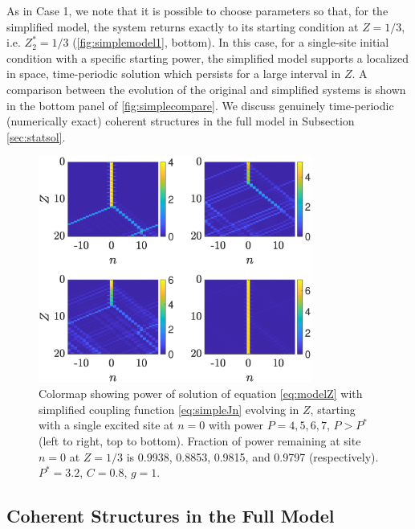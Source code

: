 \documentclass[reprint, amsmath,amssymb,aps,pre]{revtex4-2}
\begin{document}
As in Case 1, we note that it is possible to choose parameters so that, for the simplified model, the system returns exactly to its starting condition at $Z=1/3$, i.e. $Z_2^* = 1/3$ (\cref{fig:simplemodel1}, bottom). In this case, for a single-site initial condition with a specific starting power, the simplified model supports a localized in space, time-periodic solution which persists for a large interval in $Z$. A comparison between the evolution of the original and simplified systems is shown in the bottom panel of \cref{fig:simplecompare}. We discuss genuinely time-periodic (numerically exact) coherent structures in the full model in Subsection \cref{sec:statsol}. 
 
\begin{figure}
    \centering
    \includegraphics[width=9cm]{timestepsimpleabovepstar.eps}
    \caption{Colormap showing power of solution of equation \cref{eq:modelZ} with simplified coupling function \cref{eq:simpleJn} evolving in $Z$, starting with a single excited site at $n=0$ with power $P=4,5,6,7$, $P>P^*$ (left to right, top to bottom). Fraction of power remaining at site $n=0$ at $Z=1/3$ is 0.9938, 0.8853, 0.9815, and 0.9797 (respectively).
    $P^*=3.2$, $C=0.8$, $g=1$.}
    \label{fig:timestepsimpleabovepstar}
\end{figure}

\subsection{Coherent Structures in the Full Model}
\label{sec:coherent}
\end{document}
